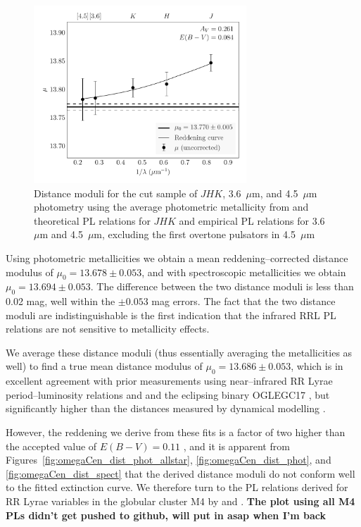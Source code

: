 \documentclass[a4paper,fleqn,usenatbib]{mnras}
\begin{document}
\begin{figure}
\begin{center}
\includegraphics[width=80mm]{final_plots/multiwavelength_distance_samestars_m4_4p5ab.pdf}
\caption{Distance moduli for the cut sample of $J\!H\!K$, 3.6~$\mu$m, and 4.5~$\mu$m photometry using the average photometric metallicity from \citet{2006ApJ...640L..43S} and theoretical PL relations for $J\!H\!K$ and empirical PL relations for 3.6~$\mu$m and 4.5~$\mu$m, excluding the first overtone pulsators in 4.5~$\mu$m}
\label{fig:omegaCen_dist_m4_4p5ab}
\end{center}
\end{figure}

Using photometric metallicities we obtain a mean reddening--corrected distance modulus of $\mu_0 = 13.678 \pm 0.053$, and with spectroscopic metallicities we obtain $\mu_0 = 13.694 \pm 0.053$.
The difference between the two distance moduli is less than 0.02 mag, well within the $\pm 0.053$ mag errors. The fact that the two distance moduli are indistinguishable is the first indication that the infrared RRL PL relations are not sensitive to metallicity effects.

We average these distance moduli (thus essentially averaging the metallicities as well) to find a true mean distance modulus of $\mu_0 = 13.686 \pm 0.053$, which is in excellent agreement with prior measurements using near--infrared RR Lyrae period--luminosity relations \citep{2006ApJ...652..362D} and and the eclipsing binary OGLEGC17 \citep{2001AJ....121.3089T}, but significantly higher than the distances measured by dynamical modelling \citep{2006A&A...445..513V,
2013MNRAS.436.2598W}.

However, the reddening we derive from these fits is a factor of two higher than the accepted value of $E(B-V) = 0.11$ \citep{2002ASPC..265...95L}, and it is apparent from Figures~\ref{fig:omegaCen_dist_phot_allstar}, \ref{fig:omegaCen_dist_phot}, and \ref{fig:omegaCen_dist_spect} that the derived distance moduli do not conform well to the fitted extinction curve. We therefore turn to the PL relations derived for RR Lyrae variables in the globular cluster M4 by \citet{2015arXiv150507858N} and \citet{2015ApJ...799..165B}. {\bf The plot using all M4 PLs didn't get pushed to github, will put in asap when I'm back}
\end{document}
